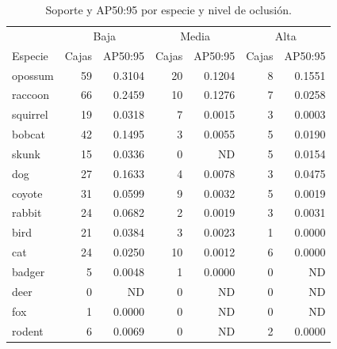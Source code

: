 \begin{table}[H]
\centering\small
\caption{Soporte y AP50:95 por especie y nivel de oclusión.}
\begin{tabular}{lr@{\hspace{1em}}rr@{\hspace{1em}}rr@{\hspace{1em}}r}
\toprule
 & \multicolumn{2}{c}{Baja} & \multicolumn{2}{c}{Media} & \multicolumn{2}{c}{Alta} \\
Especie & Cajas & AP50:95 & Cajas & AP50:95 & Cajas & AP50:95 \\
\midrule
opossum & 59 & 0.3104 & 20 & 0.1204 & 8 & 0.1551 \\
raccoon & 66 & 0.2459 & 10 & 0.1276 & 7 & 0.0258 \\
squirrel & 19 & 0.0318 & 7 & 0.0015 & 3 & 0.0003 \\
bobcat & 42 & 0.1495 & 3 & 0.0055 & 5 & 0.0190 \\
skunk & 15 & 0.0336 & 0 & ND & 5 & 0.0154 \\
dog & 27 & 0.1633 & 4 & 0.0078 & 3 & 0.0475 \\
coyote & 31 & 0.0599 & 9 & 0.0032 & 5 & 0.0019 \\
rabbit & 24 & 0.0682 & 2 & 0.0019 & 3 & 0.0031 \\
bird & 21 & 0.0384 & 3 & 0.0023 & 1 & 0.0000 \\
cat & 24 & 0.0250 & 10 & 0.0012 & 6 & 0.0000 \\
badger & 5 & 0.0048 & 1 & 0.0000 & 0 & ND \\
deer & 0 & ND & 0 & ND & 0 & ND \\
fox & 1 & 0.0000 & 0 & ND & 0 & ND \\
rodent & 6 & 0.0069 & 0 & ND & 2 & 0.0000 \\
\bottomrule
\end{tabular}
\end{table}
